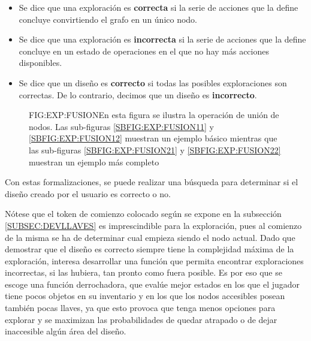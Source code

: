 \begin{itemize}
	\item Se dice que una exploración es \textbf{correcta} si la serie de acciones que la define concluye convirtiendo el grafo en un único nodo.
	
	\item Se dice que una exploración es \textbf{incorrecta} si la serie de acciones que la define concluye en un estado de operaciones en el que no hay más acciones disponibles.
	
	\item Se dice que un diseño es \textbf{correcto} si todas las posibles exploraciones son correctas. De lo contrario, decimos que un diseño es \textbf{incorrecto}.
\end{itemize}

\begin{figure}{FIG:EXP:FUSION}{En esta figura se ilustra la operación de unión de nodos. Las sub-figuras \ref{SBFIG:EXP:FUSION11} y \ref{SBFIG:EXP:FUSION12} muestran un ejemplo básico mientras que las sub-figuras \ref{SBFIG:EXP:FUSION21} y \ref{SBFIG:EXP:FUSION22} muestran un ejemplo más completo}
	 \quad
	 \quad
	 \quad
	 \quad
\end{figure}

Con estas formalizaciones, se puede realizar una búsqueda  para determinar si el diseño creado por el usuario es correcto o no.

Nótese que el token de comienzo colocado según se expone en la subsección \ref{SUBSEC:DEVLLAVES} es imprescindible para la exploración, pues al comienzo de la misma se ha de determinar cual empieza siendo el nodo actual.
Dado que demostrar que el diseño es correcto siempre tiene la complejidad máxima de la exploración, interesa desarrollar una función  que permita encontrar exploraciones incorrectas, si las hubiera, tan pronto como fuera posible.
Es por eso que se escoge una función  derrochadora, que evalúe mejor estados en los que el jugador tiene pocos objetos en su inventario y en los que los nodos accesibles posean también pocas llaves, ya que esto provoca que tenga menos opciones para explorar y se maximizan las probabilidades de quedar atrapado o de dejar inaccesible algún área del diseño.

